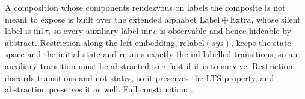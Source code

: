 \begin{definition}
  \label{def:relabel}
  \leanok
  A composition whose components rendezvous on labels the composite is not meant to expose is built over the extended alphabet $\mathrm{Label} \oplus \mathrm{Extra}$, whose silent label is $\mathrm{inl}\,\tau$, so every auxiliary label $\mathrm{inr}\,e$ is observable and hence hideable by $\mathrm{abstract}$.
  Restriction along the left embedding, $\mathrm{relabel}(sys)$, keeps the state space and the initial state and retains exactly the $\mathrm{inl}$-labelled transitions, so an auxiliary transition must be abstracted to $\tau$ first if it is to survive.
  Restriction discards transitions and not states, so it preserves the LTS property, and abstraction preserves it as well.
  Full construction: .
\end{definition}
